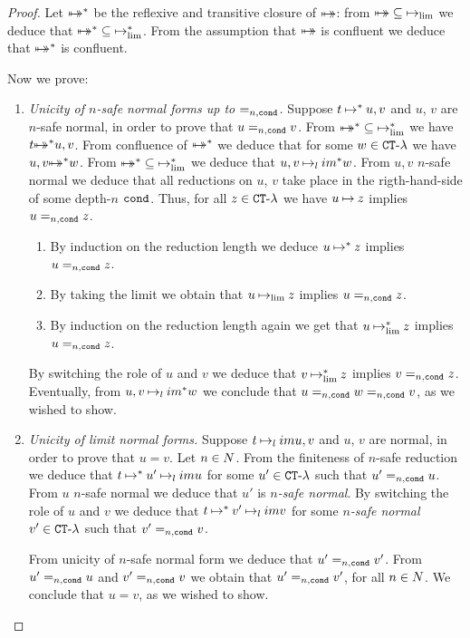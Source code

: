 \begin{proof}
Let ${\mapsto\!\!\!\!\! \mapsto}^*$ be the reflexive and transitive closure of ${\mapsto\!\!\!\!\! \mapsto}$:
from ${\mapsto\!\!\!\!\! \mapsto} \subseteq \mathbin{\mapsto}_{\lim}$ we deduce that
${\mapsto\!\!\!\!\! \mapsto}^* \subseteq \mathbin{\mapsto}_{\lim}^*$.
From the assumption that ${\mapsto\!\!\!\!\! \mapsto}$ is confluent we deduce that
${\mapsto\!\!\!\!\! \mapsto}^*$ is confluent. 

Now we prove:

\begin{enumerate}

\item
\emph{Unicity of $n$-safe normal forms up to $=_{n,{\tt cond}}$.}
Suppose  $t \mathbin{\mapsto}^* u,v$ and $u$, $v$ are $n$-safe normal, 
in order to prove that $u=_{n,{\tt cond}}  v$.
From ${\mapsto\!\!\!\!\! \mapsto}^* \subseteq \mathbin{\mapsto}_{\lim}^*$ we have 
$t {\mapsto\!\!\!\!\! \mapsto}^* u,v$. From confluence of ${\mapsto\!\!\!\!\! \mapsto}^*$
we deduce that for some $w \in { {\tt CT} \mbox{-} \lambda}$ we have $u,v {\mapsto\!\!\!\!\! \mapsto}^* w$. 
From ${\mapsto\!\!\!\!\! \mapsto}^* \subseteq \mathbin{\mapsto}_{\lim}^*$
we deduce that $u,v \mathbin{\mapsto}_lim^* w$. From $u,v$ $n$-safe normal we deduce that
all reductions on $u$, $v$ take place in the rigth-hand-side of some depth-$n$ ${\tt cond}$.
Thus, for all $z \in { {\tt CT} \mbox{-} \lambda}$ we have
 $u \mathbin{\mapsto} z$ implies $u=_{n,{\tt cond}} z$. 
\begin{enumerate} 
\item
By induction on the reduction
length we deduce $u \mathbin{\mapsto}^* z$ implies $u=_{n,{\tt cond}} z$. 
\item
By taking the limit
we obtain that $u \mathbin{\mapsto}_{\lim} z$ implies $u=_{n,{\tt cond}} z$. 
\item
By induction
on the reduction length again we get  that $u \mathbin{\mapsto}_{\lim}^* z$ implies $u=_{n,{\tt cond}} z$.
\end{enumerate}
By switching the role of $u$ and $v$ we deduce that $v \mathbin{\mapsto}_{\lim}^* z$ implies $v =_{n,{\tt cond}} z$.
Eventually, from $u,v \mathbin{\mapsto}_lim^* w$ we conclude that $u=_{n,{\tt cond}} w =_{n,{\tt cond}} v$,
as we wished to show.

\item
\emph{Unicity of limit normal forms.}
Suppose  $t \mathbin{\mapsto}_lim u,v$ and $u$, $v$ are normal, in order to prove that $u=v$.
Let $n \in {N}$.
From the finiteness of $n$-safe reduction we deduce that $t \mathbin{\mapsto}^* u' \mathbin{\mapsto}_lim u$
for some $u' \in { {\tt CT} \mbox{-} \lambda}$ such that $u' =_{n,{\tt cond}} u$. 
From $u$ $n$-safe normal we deduce that $u'$ is \emph{$n$-safe normal}.
By switching the role of $u$ and $v$ we deduce that 
$t \mathbin{\mapsto}^* v' \mathbin{\mapsto}_lim v$ for some \emph{$n$-safe normal} $v' \in { {\tt CT} \mbox{-} \lambda}$ 
such that $v'=_{n,{\tt cond}} v$.

From unicity of $n$-safe normal form we deduce that $u'=_{n,{\tt cond}} v'$.
From $u' =_{n,{\tt cond}} u$ and $v' =_{n,{\tt cond}} v$ we obtain that $u'=_{n,{\tt cond}} v'$, for all $n \in {N}$.
We conclude that $u=v$, as we wished to show.
\end{enumerate}
\end{proof}

